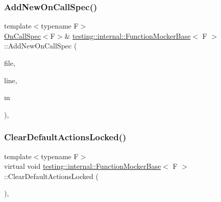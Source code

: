 \mbox{\label{classtesting_1_1internal_1_1_function_mocker_base_a22ece3b6e8d24f11d8f4ba9c17b737c4}} 
\subsubsection{\texorpdfstring{Add\+New\+On\+Call\+Spec()}{AddNewOnCallSpec()}}
{\footnotesize\ttfamily template$<$typename F$>$ \\
\hyperlink{classtesting_1_1internal_1_1_on_call_spec}{On\+Call\+Spec}$<$F$>$\& \hyperlink{classtesting_1_1internal_1_1_function_mocker_base}{testing\+::internal\+::\+Function\+Mocker\+Base}$<$ F $>$\+::Add\+New\+On\+Call\+Spec (\begin{DoxyParamCaption}\item[{const char $\ast$}]{file,  }\item[{int}]{line,  }\item[{const \hyperlink{classtesting_1_1internal_1_1_function_mocker_base_ab790bcb1dcf57fa6659365386723ae5a}{Argument\+Matcher\+Tuple} \&}]{m }\end{DoxyParamCaption})\hspace{0.3cm}{\ttfamily [inline]}, {\ttfamily [protected]}}

\mbox{\label{classtesting_1_1internal_1_1_function_mocker_base_ada818fcb2b892f21bb939def386599e7}} 
\subsubsection{\texorpdfstring{Clear\+Default\+Actions\+Locked()}{ClearDefaultActionsLocked()}}
{\footnotesize\ttfamily template$<$typename F$>$ \\
virtual void \hyperlink{classtesting_1_1internal_1_1_function_mocker_base}{testing\+::internal\+::\+Function\+Mocker\+Base}$<$ F $>$\+::Clear\+Default\+Actions\+Locked (\begin{DoxyParamCaption}{ }\end{DoxyParamCaption})\hspace{0.3cm}{\ttfamily [inline]}, {\ttfamily [virtual]}}



